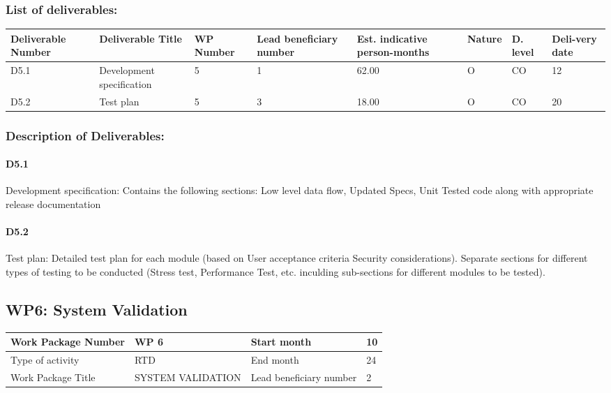 \documentclass{article}
\begin{document}
\subsubsection{List of deliverables:}
\begin{center}
	\begin{tabular}{ |p{1.6cm}|p{2cm}|p{0.8cm}|p{0.8cm}|p{0.9cm}|p{1cm}|p{0.5cm}|p{0.8cm}| }
		\hline
		Deliverable Number & Deliverable Title & WP Number & Lead beneficiary number & Est. indicative person-months & Nature & D. level & Deli-very date \\ \hline
		D5.1 & Development specification & 5 & 1 & 62.00 & O & CO & 12 \\ \hline
		D5.2 & Test plan & 5 & 3 & 18.00 & O & CO & 20 \\ \hline
	\end{tabular}
\end{center}

\subsubsection{Description of Deliverables:}
\paragraph{D5.1} Development specification: Contains the following sections: Low level data flow, Updated Specs, Unit Tested code along with appropriate release documentation
\paragraph{D5.2} Test plan: Detailed test plan for each module (based on User acceptance
criteria Security considerations). Separate sections for different types of testing to be conducted (Stress test, Performance Test, etc. inculding sub-sections for
different modules to be tested). 

\newpage

\subsection{WP6: System Validation}

\begin{center}
	\begin{tabular}{ |p{3cm}|p{4cm}||p{2cm}|p{1cm}| }
		\hline
		Work Package Number & WP 6 & Start month & 10  \\ \hline
		Type of activity & RTD & End month & 24 \\ \hline
		Work Package Title & SYSTEM VALIDATION & Lead beneficiary number & 2 \\ \hline
	\end{tabular}
\end{center}
\end{document}

